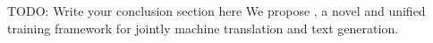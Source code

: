 

TODO: Write your conclusion section here
We propose \method, a novel and unified training framework for jointly machine translation and text generation. 